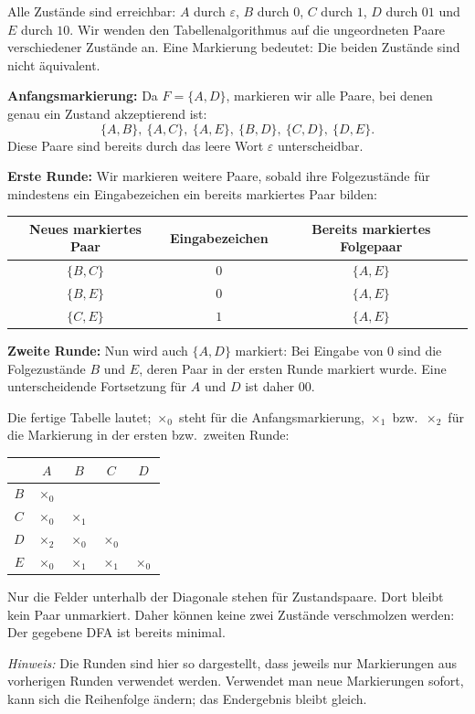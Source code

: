 \begin{loesung}
Alle Zustände sind erreichbar: $A$ durch $\varepsilon$, $B$ durch $0$,
$C$ durch $1$, $D$ durch $01$ und $E$ durch $10$.
Wir wenden den Tabellenalgorithmus auf die ungeordneten Paare verschiedener
Zustände an. Eine Markierung bedeutet: Die beiden Zustände sind nicht äquivalent.

\textbf{Anfangsmarkierung:} Da $F=\{A,D\}$, markieren wir alle Paare,
bei denen genau ein Zustand akzeptierend ist:
\[
\{A,B\},\ \{A,C\},\ \{A,E\},\ \{B,D\},\ \{C,D\},\ \{D,E\}.
\]
Diese Paare sind bereits durch das leere Wort $\varepsilon$ unterscheidbar.

\textbf{Erste Runde:} Wir markieren weitere Paare, sobald ihre Folgezustände
für mindestens ein Eingabezeichen ein bereits markiertes Paar bilden:
\begin{center}
\begin{tabular}{c|c|c}
Neues markiertes Paar & Eingabezeichen & Bereits markiertes Folgepaar\\\hline
$\{B,C\}$ & $0$ & $\{A,E\}$\\
$\{B,E\}$ & $0$ & $\{A,E\}$\\
$\{C,E\}$ & $1$ & $\{A,E\}$
\end{tabular}
\end{center}
\textbf{Zweite Runde:} Nun wird auch $\{A,D\}$ markiert: Bei Eingabe von $0$
sind die Folgezustände $B$ und $E$, deren Paar in der ersten Runde markiert wurde.
Eine unterscheidende Fortsetzung für $A$ und $D$ ist daher $00$.

Die fertige Tabelle lautet; $\times_0$ steht für die Anfangsmarkierung,
$\times_1$ bzw.\ $\times_2$ für die Markierung in der ersten bzw.\ zweiten Runde:
\begin{center}
\begin{tabular}{c|cccc}
 & $A$ & $B$ & $C$ & $D$\\\hline
$B$ & $\times_0$ & & &\\
$C$ & $\times_0$ & $\times_1$ & &\\
$D$ & $\times_2$ & $\times_0$ & $\times_0$ &\\
$E$ & $\times_0$ & $\times_1$ & $\times_1$ & $\times_0$
\end{tabular}
\end{center}
Nur die Felder unterhalb der Diagonale stehen für Zustandspaare.
Dort bleibt kein Paar unmarkiert. Daher können keine zwei Zustände
verschmolzen werden: Der gegebene DFA ist bereits minimal.

\emph{Hinweis:} Die Runden sind hier so dargestellt, dass jeweils nur
Markierungen aus vorherigen Runden verwendet werden. Verwendet man neue
Markierungen sofort, kann sich die Reihenfolge ändern; das Endergebnis bleibt gleich.
\end{loesung}

